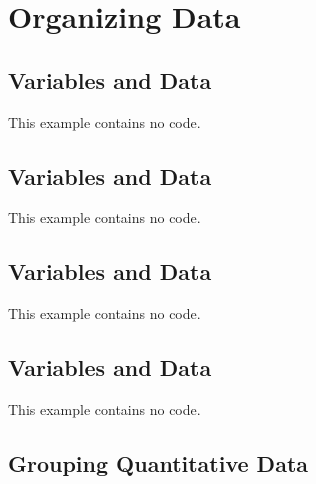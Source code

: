 \documentclass{article}\usepackage[]{graphicx}\usepackage[]{color}
\begin{document}
\subsection{}

\section{Organizing Data}

\subsection{Variables and Data}This example contains no code.

\subsection{Variables and Data}This example contains no code.

\subsection{Variables and Data}This example contains no code.

\subsection{Variables and Data}This example contains no code.

\subsection{Grouping Quantitative Data}
\end{document}
